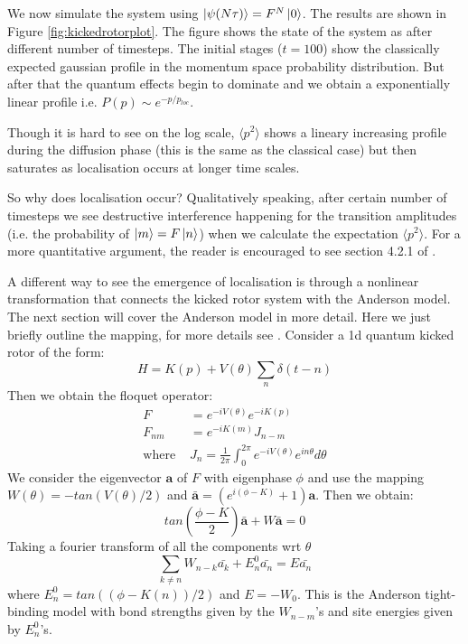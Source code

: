\documentclass[twocolumn]{report}
\begin{document}
We now simulate the system using $\ket{\psi(N\tau)} = F^N \ket{0}$. The
results are shown in Figure \ref{fig:kickedrotorplot}. The figure shows the
state of the system as after different number of timesteps. The initial
stages ($t = 100$) show the classically expected gaussian profile in the
momentum space probability distribution. But after that the quantum effects
begin to dominate and we obtain a exponentially linear profile i.e. $P(p)
\sim e^{-p/p_{loc}}$.

Though it is hard to see on the log scale, $\langle p^2 \rangle$ shows a
lineary increasing profile during the diffusion phase (this is the same as
the classical case) but then saturates as localisation occurs at longer time
scales.

So why does localisation occur? Qualitatively speaking, after certain
number of timesteps we see destructive interference happening for
the transition amplitudes (i.e. the probability of $\ket{m} = F\ket{n}$)
when we calculate the expectation $\langle p^2 \rangle$. For a more
quantitative argument, the reader is encouraged to see section 4.2.1 of
\cite{stockmann}.

A different way to see the emergence of localisation is through a nonlinear
transformation that connects the kicked rotor system with the Anderson model.
The next section will cover the Anderson model in more detail. Here we just
briefly outline the mapping, for more details see \cite{stockmann}.
Consider a 1d quantum kicked rotor of the form:
\begin{equation}
    H = K(p) + V(\theta)\sum_{n} \delta(t - n)
\end{equation}
Then we obtain the floquet operator:
\begin{align}
    F &= e^{-iV(\theta)} e^{-iK(p)} \\
    F_{nm} &= e^{-iK(m)} J_{n-m} \\
    \text{where } & J_n = \frac{1}{2\pi} \int_0^{2\pi} e^{-iV(\theta)}
    e^{in\theta} d\theta
\end{align}
We consider the eigenvector $\mathbf{a}$ of $F$ with eigenphase $\phi$
and use the mapping $W(\theta) = -tan(V(\theta) / 2)$ and $\bar{\mathbf{a}}
= (e^{i(\phi - K)} + 1)\mathbf{a}$. Then we obtain:
\begin{equation}
    tan\left(\frac{\phi - K}{2}\right) \bar{\mathbf{a}} + W\bar{\mathbf{a}} = 0
\end{equation}
Taking a fourier transform of all the components wrt $\theta$
\begin{equation}
    \sum_{k \neq n} W_{n-k} \bar{a_k} + E^0_n \bar{a_n} = E \bar{a_n}
\end{equation}
where $E_n^0 = tan((\phi - K(n)) / 2)$ and $E = -W_0$. This is the Anderson
tight-binding model with bond strengths given by the $W_{n-m}$'s and site
energies given by $E^0_n$'s.
\end{document}
